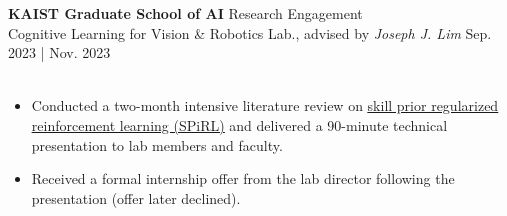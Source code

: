 \documentclass[a4paper,10pt]{extarticle}
\begin{document}
\vspace*{0.12cm}
\noindent\textbf{KAIST Graduate School of AI} \hfill Research Engagement\\
Cognitive Learning for Vision \& Robotics Lab., advised by \textsl{Joseph J. Lim} \hfill Sep. 2023 | Nov. 2023\\
\vspace*{-0.25cm}\\
\begin{minipage}{0.77\textwidth}
	\footnotesize
	\begin{itemize}
		\item Conducted a two-month intensive literature review on \href{https://clvrai.github.io/spirl/}{\ul{skill prior regularized reinforcement learning (SPiRL)}} and delivered a 90-minute technical presentation to lab members and faculty.
		\item Received a formal internship offer from the lab director following the presentation (offer later declined).
	\end{itemize}
\end{minipage}\\
\end{document}
